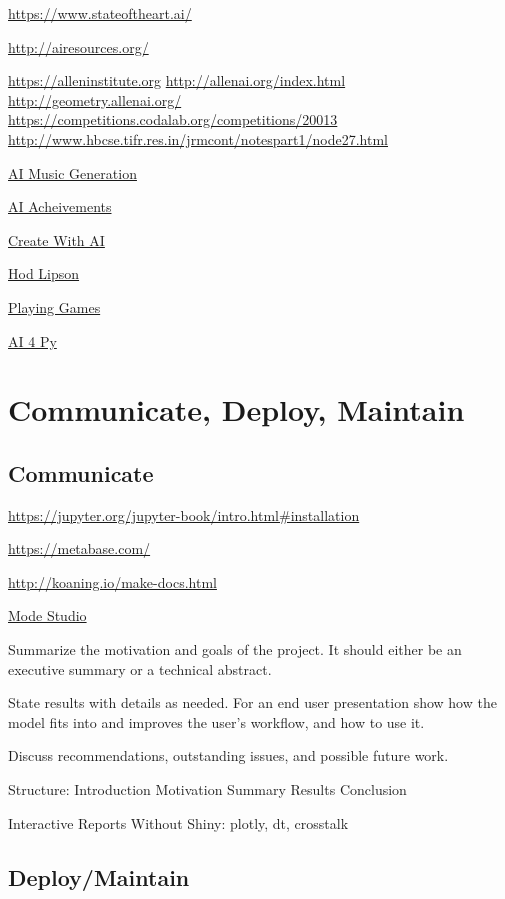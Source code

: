 \documentclass[]{book}
\begin{document}
\url{https://www.stateoftheart.ai/}

\url{http://airesources.org/}

\url{https://alleninstitute.org} \textbar{}
\url{http://allenai.org/index.html} \textbar{}
\url{http://geometry.allenai.org/} \textbar{}
\url{https://competitions.codalab.org/competitions/20013} \textbar{}
\url{http://www.hbcse.tifr.res.in/jrmcont/notespart1/node27.html}

\href{https://www.jukedeck.com}{AI Music Generation}

\href{https://poo.ai/}{AI Acheivements}

\href{http://createwith.ai/}{Create With AI}

\href{http://www.hodlipson.com/}{Hod Lipson}

\href{http://www.ggp.org/}{Playing Games}

\href{https://wiki.python.org/moin/PythonForArtificialIntelligence}{AI 4
Py}

\chapter{Communicate, Deploy,
Maintain}\label{communicate-deploy-maintain}

\section{Communicate}\label{communicate-1}

\url{https://jupyter.org/jupyter-book/intro.html\#installation}

\url{https://metabase.com/}

\url{http://koaning.io/make-docs.html}

\href{https://about.modeanalytics.com/}{Mode Studio}

Summarize the motivation and goals of the project. It should either be
an executive summary or a technical abstract.

State results with details as needed. For an end user presentation show
how the model fits into and improves the user's workflow, and how to use
it.

Discuss recommendations, outstanding issues, and possible future work.

Structure: Introduction \textbar{} Motivation \textbar{} Summary
\textbar{} Results \textbar{} Conclusion

Interactive Reports Without Shiny: plotly, dt, crosstalk

\section{Deploy/Maintain}\label{deploymaintain}
\end{document}
